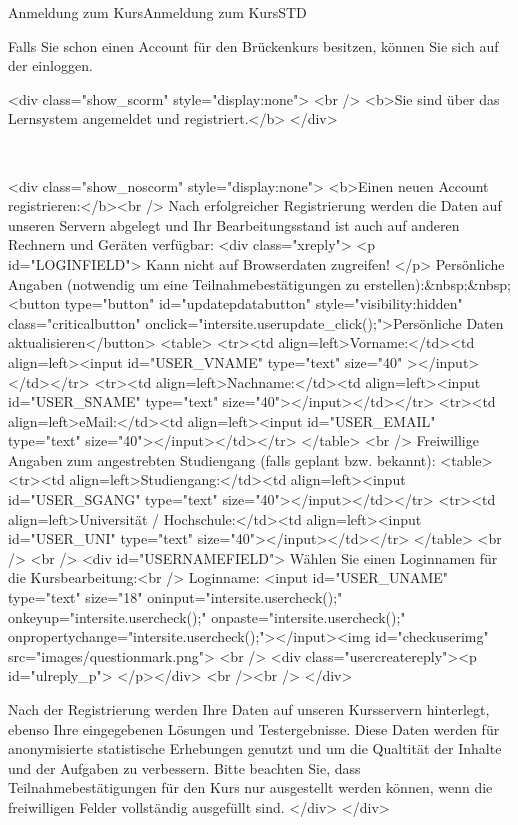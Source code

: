 \begin{MXContent}{Anmeldung zum Kurs}{Anmeldung zum Kurs}{STD}
\MGlobalConfTag
{}

Falls Sie schon einen Account für den Brückenkurs besitzen,
können Sie sich auf der  einloggen.
\begin{html}
<div class="show_scorm" style="display:none">
<br />
<b>Sie sind über das Lernsystem angemeldet und registriert.</b>
</div>
\end{html}
\ \\

\begin{html}
<div class="show_noscorm" style="display:none">
<b>Einen neuen Account registrieren:</b><br />
Nach erfolgreicher Registrierung werden die Daten auf unseren Servern abgelegt
und Ihr Bearbeitungsstand ist auch auf anderen Rechnern und Geräten verfügbar:
<div class="xreply">
<p id="LOGINFIELD">
Kann nicht auf Browserdaten zugreifen!
</p>
Persönliche Angaben (notwendig um eine Teilnahmebestätigungen zu erstellen):&nbsp;&nbsp;<button type="button" id="updatepdatabutton" style="visibility:hidden" class="criticalbutton" onclick="intersite.userupdate_click();">Persönliche Daten aktualisieren</button>
<table>
  <tr><td align=left>Vorname:</td><td align=left><input id="USER_VNAME" type="text" size="40" ></input></td></tr>
  <tr><td align=left>Nachname:</td><td align=left><input id="USER_SNAME" type="text" size="40"></input></td></tr>
  <tr><td align=left>eMail:</td><td align=left><input id="USER_EMAIL" type="text" size="40"></input></td></tr>
</table>
<br />
Freiwillige Angaben zum angestrebten Studiengang (falls geplant bzw. bekannt):
<table>
  <tr><td align=left>Studiengang:</td><td align=left><input id="USER_SGANG" type="text" size="40"></input></td></tr>
  <tr><td align=left>Universität / Hochschule:</td><td align=left><input id="USER_UNI" type="text" size="40"></input></td></tr>
</table>
<br />
<br />
<div id="USERNAMEFIELD">
Wählen Sie einen Loginnamen für die Kursbearbeitung:<br />
Loginname: <input id="USER_UNAME" type="text" size="18" oninput="intersite.usercheck();" onkeyup="intersite.usercheck();" onpaste="intersite.usercheck();" onpropertychange="intersite.usercheck();"></input><img id="checkuserimg" src="images/questionmark.png">
<br />
<div class="usercreatereply"><p id="ulreply_p"> </p></div>
<br /><br />
</div>

Nach der Registrierung werden Ihre Daten auf unseren Kursservern hinterlegt, ebenso Ihre eingegebenen Lösungen und Testergebnisse. Diese Daten werden für anonymisierte
statistische Erhebungen genutzt und um die Qualtität der Inhalte und der Aufgaben zu verbessern. Bitte beachten Sie, dass Teilnahmebestätigungen für den Kurs nur ausgestellt
werden können, wenn die freiwilligen Felder vollständig ausgefüllt sind.
</div>
</div>
\end{html}


\end{MXContent}
